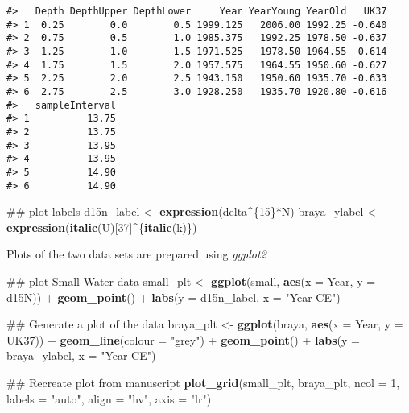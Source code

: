 \documentclass[12pt,]{article}
\newenvironment{Shaded}{\begin{snugshade}}{\end{snugshade}}
\newcommand{\KeywordTok}[1]{\textcolor[rgb]{0.13,0.29,0.53}{\textbf{{#1}}}}
\newcommand{\DataTypeTok}[1]{\textcolor[rgb]{0.13,0.29,0.53}{{#1}}}
\newcommand{\DecValTok}[1]{\textcolor[rgb]{0.00,0.00,0.81}{{#1}}}
\newcommand{\StringTok}[1]{\textcolor[rgb]{0.31,0.60,0.02}{{#1}}}
\newcommand{\NormalTok}[1]{{#1}}
\begin{document}
\begin{verbatim}
#>   Depth DepthUpper DepthLower     Year YearYoung YearOld   UK37
#> 1  0.25        0.0        0.5 1999.125   2006.00 1992.25 -0.640
#> 2  0.75        0.5        1.0 1985.375   1992.25 1978.50 -0.637
#> 3  1.25        1.0        1.5 1971.525   1978.50 1964.55 -0.614
#> 4  1.75        1.5        2.0 1957.575   1964.55 1950.60 -0.627
#> 5  2.25        2.0        2.5 1943.150   1950.60 1935.70 -0.633
#> 6  2.75        2.5        3.0 1928.250   1935.70 1920.80 -0.616
#>   sampleInterval
#> 1          13.75
#> 2          13.75
#> 3          13.95
#> 4          13.95
#> 5          14.90
#> 6          14.90
\end{verbatim}

\begin{Shaded}
\begin{Highlighting}[]
\NormalTok{## plot labels}
\NormalTok{d15n_label <-}\StringTok{ }\KeywordTok{expression}\NormalTok{(delta^\{}\DecValTok{15}\NormalTok{\}*N)}
\NormalTok{braya_ylabel <-}\StringTok{ }\KeywordTok{expression}\NormalTok{(}\KeywordTok{italic}\NormalTok{(U)[}\DecValTok{37}\NormalTok{]^\{}\KeywordTok{italic}\NormalTok{(k)\})}
\end{Highlighting}
\end{Shaded}

Plots of the two data sets are prepared using \emph{ggplot2}

\begin{Shaded}
\begin{Highlighting}[]
\NormalTok{## plot Small Water data}
\NormalTok{small_plt <-}\StringTok{ }\KeywordTok{ggplot}\NormalTok{(small, }\KeywordTok{aes}\NormalTok{(}\DataTypeTok{x =} \NormalTok{Year, }\DataTypeTok{y =} \NormalTok{d15N)) +}
\StringTok{    }\KeywordTok{geom_point}\NormalTok{() +}
\StringTok{    }\KeywordTok{labs}\NormalTok{(}\DataTypeTok{y =} \NormalTok{d15n_label, }\DataTypeTok{x =} \StringTok{"Year CE"}\NormalTok{)}

\NormalTok{## Generate a plot of the data}
\NormalTok{braya_plt <-}\StringTok{ }\KeywordTok{ggplot}\NormalTok{(braya, }\KeywordTok{aes}\NormalTok{(}\DataTypeTok{x =} \NormalTok{Year, }\DataTypeTok{y =} \NormalTok{UK37)) +}
\StringTok{    }\KeywordTok{geom_line}\NormalTok{(}\DataTypeTok{colour =} \StringTok{"grey"}\NormalTok{) +}
\StringTok{    }\KeywordTok{geom_point}\NormalTok{() +}
\StringTok{    }\KeywordTok{labs}\NormalTok{(}\DataTypeTok{y =} \NormalTok{braya_ylabel, }\DataTypeTok{x =} \StringTok{"Year CE"}\NormalTok{)}

\NormalTok{## Recreate plot from manuscript}
\KeywordTok{plot_grid}\NormalTok{(small_plt, braya_plt, }\DataTypeTok{ncol =} \DecValTok{1}\NormalTok{, }\DataTypeTok{labels =} \StringTok{"auto"}\NormalTok{, }\DataTypeTok{align =} \StringTok{"hv"}\NormalTok{,}
          \DataTypeTok{axis =} \StringTok{"lr"}\NormalTok{)}
\end{Highlighting}
\end{Shaded}
\end{document}
